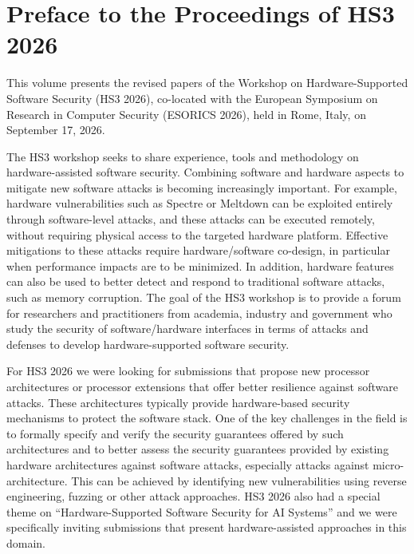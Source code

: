 \documentclass[runningheads]{llncs}
\begin{document}
\frontmatter
\setcounter{page}{5}

\chapter*{Preface to the Proceedings of HS3 2026}

This volume presents the revised papers of the  Workshop on
Hardware-Supported Software Security (HS3 2026), co-located with the
 European Symposium on Research in Computer Security (ESORICS
2026), held in Rome, Italy, on September 17, 2026.

The HS3 workshop seeks to share experience, tools and methodology on
hardware-assisted software security. Combining software and hardware
aspects to mitigate new software attacks is becoming increasingly
important. For example, hardware vulnerabilities such as Spectre or
Meltdown can be exploited entirely through software-level attacks, and these
attacks can be executed remotely, without requiring physical access to the
targeted hardware platform. Effective mitigations to these attacks require
hardware/software co-design, in particular when performance impacts are to
be minimized. In addition, hardware features can also be used to better
detect and respond to traditional software attacks, such as memory
corruption. The goal of the HS3 workshop is to provide a forum for
researchers and practitioners from academia, industry and government who
study the security of software/hardware interfaces in terms of attacks and
defenses to develop hardware-supported software security.

For HS3 2026 we were looking for submissions that propose new processor
architectures or processor extensions that offer better resilience against
software attacks. These architectures typically provide hardware-based
security mechanisms to protect the software stack. One of the key
challenges in the field is to formally specify and verify the security
guarantees offered by such architectures and to better assess the security
guarantees provided by existing hardware architectures against software
attacks, especially attacks against micro-architecture. This can be
achieved by identifying new vulnerabilities using reverse engineering,
fuzzing or other attack approaches. HS3 2026 also had a special theme on
\enquote{Hardware-Supported Software Security for AI Systems} and
we were specifically inviting submissions that present hardware-assisted
approaches in this domain.
\end{document}
